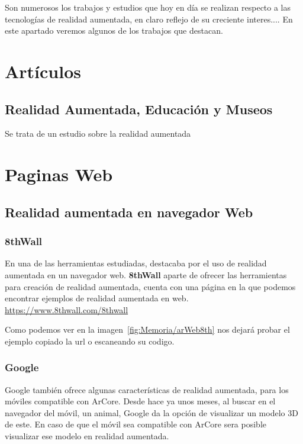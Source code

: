 
Son numerosos los trabajos y estudios que hoy en día se realizan respecto a las tecnologías de realidad aumentada, en claro reflejo de su creciente interes....  En este apartado veremos algunos de los trabajos que destacan.

\section{Artículos}
\subsection{Realidad Aumentada, Educación y Museos}
 
 Se trata de un estudio sobre la realidad aumentada

\section{Paginas Web}
\subsection{Realidad aumentada en navegador Web}
\subsubsection{8thWall}
En una de las herramientas estudiadas, destacaba por el uso de realidad aumentada en un navegador web.
\textbf{8thWall} aparte de ofrecer las herramientas para creación de realidad aumentada, cuenta con una página en la que podemos encontrar ejemplos de realidad aumentada en web.
\url{https://www.8thwall.com/8thwall}


Como podemos ver en la imagen~\ref{fig:Memoria/arWeb8th} nos dejará probar el ejemplo copiado la url o escaneando su codigo.

\subsubsection{Google}
Google también ofrece algunas características de realidad aumentada, para los móviles compatible con ArCore. Desde hace ya unos meses, al buscar en el navegador del móvil, un animal, Google da la opción de visualizar un modelo 3D de este. En caso de que el móvil sea compatible con ArCore sera posible visualizar ese modelo en realidad aumentada.


